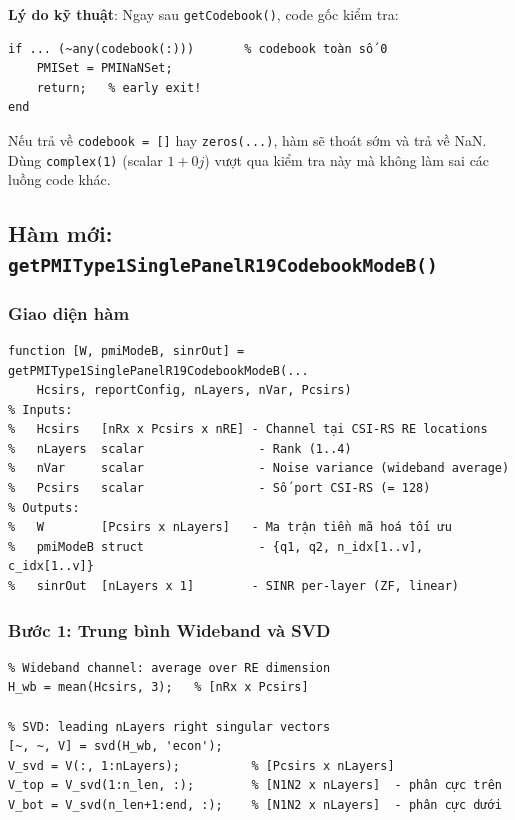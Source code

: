 \documentclass[11pt,a4paper]{article}
\begin{document}
\noindent\textbf{Lý do kỹ thuật}: Ngay sau \texttt{getCodebook()}, code gốc kiểm tra:
\begin{lstlisting}
if ... (~any(codebook(:)))       % codebook toàn số 0
    PMISet = PMINaNSet;
    return;   % early exit!
end
\end{lstlisting}
Nếu trả về \texttt{codebook = []} hay \texttt{zeros(...)}, hàm sẽ thoát sớm
và trả về NaN. Dùng \texttt{complex(1)} (scalar $1+0j$) vượt qua kiểm tra này
mà không làm sai các luồng code khác.

\subsection{Hàm mới: \texttt{getPMIType1SinglePanelR19CodebookModeB()}}

\subsubsection{Giao diện hàm}

\begin{lstlisting}
function [W, pmiModeB, sinrOut] = getPMIType1SinglePanelR19CodebookModeB(...
    Hcsirs, reportConfig, nLayers, nVar, Pcsirs)
% Inputs:
%   Hcsirs   [nRx x Pcsirs x nRE] - Channel tại CSI-RS RE locations
%   nLayers  scalar                - Rank (1..4)
%   nVar     scalar                - Noise variance (wideband average)
%   Pcsirs   scalar                - Số port CSI-RS (= 128)
% Outputs:
%   W        [Pcsirs x nLayers]   - Ma trận tiền mã hoá tối ưu
%   pmiModeB struct                - {q1, q2, n_idx[1..v], c_idx[1..v]}
%   sinrOut  [nLayers x 1]        - SINR per-layer (ZF, linear)
\end{lstlisting}

\subsubsection{Bước 1: Trung bình Wideband và SVD}

\begin{lstlisting}
% Wideband channel: average over RE dimension
H_wb = mean(Hcsirs, 3);   % [nRx x Pcsirs]

% SVD: leading nLayers right singular vectors
[~, ~, V] = svd(H_wb, 'econ');
V_svd = V(:, 1:nLayers);          % [Pcsirs x nLayers]
V_top = V_svd(1:n_len, :);        % [N1N2 x nLayers]  - phân cực trên
V_bot = V_svd(n_len+1:end, :);    % [N1N2 x nLayers]  - phân cực dưới
\end{lstlisting}
\end{document}
